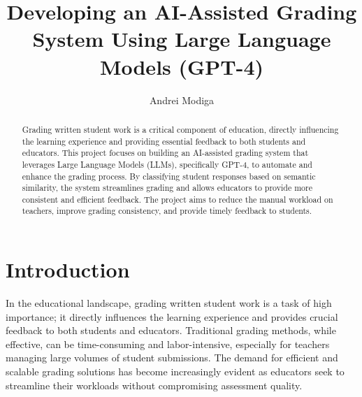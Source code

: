 \documentclass[ms,twoside,print]{nuthesis}
\begin{document}
\frontmatter

\title{Developing an AI-Assisted Grading System Using Large Language Models (GPT-4)}
\author{Andrei Modiga}



\maketitle

\begin{abstract}
Grading written student work is a critical component of education, directly influencing the learning experience and providing essential feedback to both students and educators. This project focuses on building an AI-assisted grading system that leverages Large Language Models (LLMs), specifically GPT-4, to automate and enhance the grading process. By classifying student responses based on semantic similarity, the system streamlines grading and allows educators to provide more consistent and efficient feedback. The project aims to reduce the manual workload on teachers, improve grading consistency, and provide timely feedback to students.
\end{abstract}

\setcounter{tocdepth}{2} %
\tableofcontents
\listoffigures
\listoftables

\mainmatter

\chapter{Introduction}
In the educational landscape, grading written student work is a task of high importance; it directly influences the learning experience and provides crucial feedback to both students and educators. Traditional grading methods, while effective, can be time-consuming and labor-intensive, especially for teachers managing large volumes of student submissions. The demand for efficient and scalable grading solutions has become increasingly evident as educators seek to streamline their workloads without compromising assessment quality.
\end{document}
